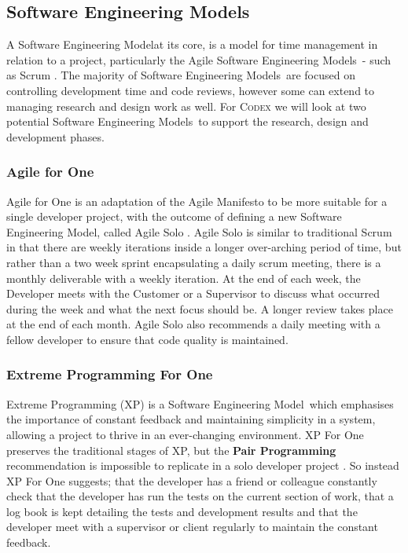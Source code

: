 \documentclass[review]{cmpreport}
\newcommand{\sem}{Software Engineering Model}
\newcommand{\sems}{Software Engineering Models}
\begin{document}
	\subsection{Software Engineering Models} \label{SEMLit}
	A \sem at its core, is a model for time management in relation to a project, particularly the Agile \sems \ - such as Scrum  \citep{Scrum} . The majority of \sems \ are focused on controlling development time and code reviews, however some can extend to managing research and design work as well. For \textsc{Codex} we will look at two potential \sems \ to support the research, design and development phases. 
	 
	\subsubsection{Agile for One}
	Agile for One is an adaptation of the Agile Manifesto to be more suitable for a single developer project, with the outcome of defining a new \sem , called Agile Solo \citep{AgileSolo}. Agile Solo is similar to traditional Scrum in that there are weekly iterations inside a longer over-arching period of time, but rather than a two week sprint encapsulating a daily scrum meeting, there is a monthly deliverable with a weekly iteration. At the end of each week, the Developer meets with the Customer or a Supervisor to discuss what occurred during the week and what the next focus should be. A longer review takes place at the end of each month. Agile Solo also recommends a daily meeting with a fellow developer to ensure that code quality is maintained. 
	
	\subsubsection{Extreme Programming For One}
	Extreme Programming (XP) is a \sem \ which emphasises the importance of constant feedback and maintaining simplicity in a system, allowing a project to thrive in an ever-changing environment. XP For One preserves the traditional stages of XP, but the \textbf{Pair Programming} recommendation is impossible to replicate in a solo developer project \citep{SoloXP}. So instead XP For One suggests; that the developer has a friend or colleague constantly check that the developer has run the tests on the current section of work, that a log book is kept detailing the tests and development results and that the developer meet with a supervisor or client regularly to maintain the constant feedback. 
	
\end{document}
